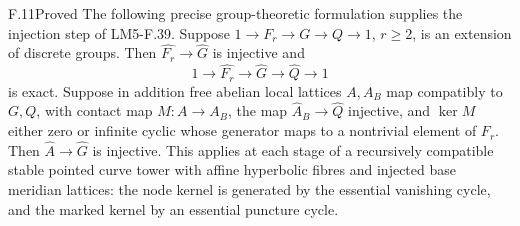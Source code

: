 \begin{claim}{F.11}{Proved}
The following precise group-theoretic formulation supplies the
injection step of LM5-F.39. Suppose
$1\to F_r\to G\to Q\to1$, $r\ge2$, is an extension of discrete
groups. Then $\widehat{F_r}\to\widehat G$ is injective and
\[
1\longrightarrow\widehat{F_r}\longrightarrow\widehat G
 \longrightarrow\widehat Q\longrightarrow1
\]
is exact. Suppose in addition free abelian local lattices $A,A_B$
map compatibly to $G,Q$, with contact map $M:A\to A_B$, the map
$\widehat A_B\to\widehat Q$ injective, and $\ker M$ either zero
or infinite cyclic whose generator maps to a nontrivial element of
$F_r$. Then $\widehat A\to\widehat G$ is injective. This applies
at each stage of a recursively compatible stable pointed curve
tower with affine hyperbolic fibres and injected base meridian
lattices: the node kernel is generated by the essential vanishing
cycle, and the marked kernel by an essential puncture cycle.
\end{claim}
